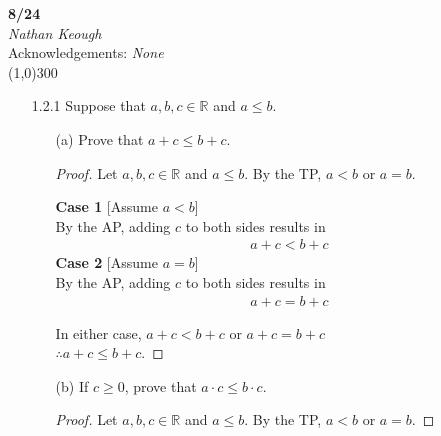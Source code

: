 \documentclass[a4paper]{article}
\newcommand{\bb}{\textbf}
\begin{document}
    \begin{center}
        \Large \textbf{8/24} \\
        \large \textit{Nathan Keough} \\
        Acknowledgements: \emph{None} \vspace{.5pc} \\ \line(1,0){300} 
        \vspace{1pc}
    \end{center} 
    
    \begin{flushleft}
        \begin{enumerate}
            \item [1.2.1]
            Suppose that $a, b, c \in \mathbb{R}$ and $a\leq b$.

            \begin{enumerate}
                \item [(a)]
                Prove that $a + c\leq b + c$. 
                \begin{proof} 
                    Let $a,b,c \in \mathbb{R}$ and $a\leq b$.
                    By the TP, $a < b$ or $a = b$.

                    \bb{Case 1} [Assume $a < b$] \\
                    By the AP, adding $c$ to both sides results in 
                        \begin{align}
                            &    a + c < b + c
                        \end{align}
                    \bb{Case 2} [Assume $a = b$] \\
                    By the AP, adding $c$ to both sides results in 
                        \begin{align}
                            &    a + c = b + c
                        \end{align}
                    
                    In either case, $a + c < b + c$ or $a + c = b + c$ \\
                    $\therefore a + c\leq b + c$.
                \end{proof}

                \item [(b)]
                If $c\geq 0$, prove that $a \cdot c\leq b \cdot  c$.
                \begin{proof}
                    Let $a,b,c \in \mathbb{R}$ and $a\leq b$.
                    By the TP, $a < b$ or $a = b$. 


\end{proof}
\end{enumerate}
\end{enumerate}
\end{flushleft}
\end{document}
